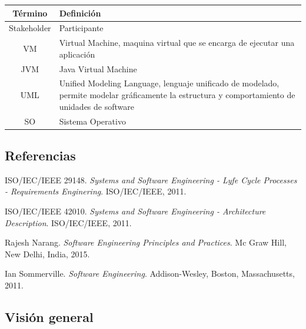 \documentclass[paper=a4,oneside,fontsize=12pt]{article}
\begin{document}
	\begin{table}[h!]
		\begin{tabularx}{\textwidth}{|c|X|} 
			\hline
			\textbf{Término} & \textbf{Definición} \\
			\hline
			Stakeholder & Participante \\
			\hline
			VM	& Virtual Machine, maquina virtual que se encarga de ejecutar una aplicación \\
			\hline
			JVM & Java Virtual Machine \\
			\hline
			UML & Unified Modeling Language, lenguaje unificado de modelado, permite modelar gráficamente la estructura y comportamiento de unidades de software \\
			\hline
			SO & Sistema Operativo \\
			\hline
		\end{tabularx}	
	\end{table}

	\subsection{Referencias}
	
	
	\begingroup
		\renewcommand{\section}[2]{}
		\begin{thebibliography}{9}
			ISO/IEC/IEEE 29148. 
			\textit{Systems and Software Engineering - Lyfe Cycle Processes - Requirements Enginering}. 
			ISO/IEC/IEEE, 2011.
			
			ISO/IEC/IEEE 42010. 
			\textit{Systems and Software Engineering - Architecture Description}. 
			ISO/IEC/IEEE, 2011.		
			
			Rajesh Narang. 
			\textit{Software Engineering Principles and Practices}. 
			Mc Graw Hill, New Delhi, India, 2015.			
			
			Ian Sommerville. 
			\textit{Software Engineering}. 
			Addison-Wesley, Boston, Massachusetts, 2011.				

		\end{thebibliography}
	\endgroup

	
	\subsection{Visión general}
	
\end{document}

